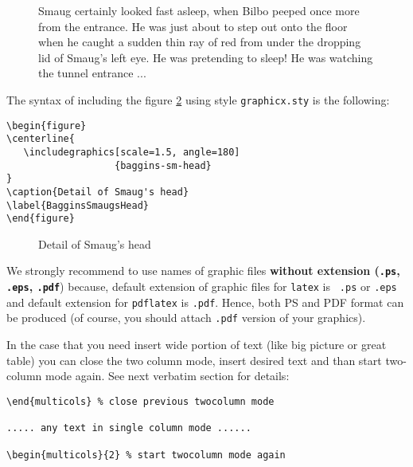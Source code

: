 \begin{multicols}{2}
\begin{figure}
\caption{\label{BagginsSmaug}Smaug certainly looked fast asleep, when Bilbo peeped once more from the
  entrance. He was just about to step out onto the floor when he caught a sudden thin ray
  of red from under the dropping lid of Smaug's left eye. He was pretending to sleep! He
  was watching the tunnel entrance ...}
\end{figure}


The syntax of including the figure \ref{BagginsSmaugsHead} using
style {\tt graphicx.sty} is the following:


\begin{Verbatim}[fontsize=\relsize{-2}]
\begin{figure}
\centerline{
   \includegraphics[scale=1.5, angle=180]
                   {baggins-sm-head}
}
\caption{Detail of Smaug's head}
\label{BagginsSmaugsHead}
\end{figure}
\end{Verbatim}



\begin{figure}
\caption{Detail of Smaug's head}
\label{BagginsSmaugsHead}
\end{figure}



We strongly recommend to use names of graphic files {\bf without extension ({\tt .ps}, {\tt
  .eps}, {\tt .pdf}}) because, default extension of graphic files for {\tt latex} is {\tt
  .ps} or {\tt .eps} and default extension for {\tt pdflatex} is {\tt .pdf}. Hence, both
PS and PDF format can be produced (of course, you should attach {\tt .pdf} version of
your graphics).

\end{multicols}






In the case that you need insert wide portion of text (like big picture or great table) you
can close the two column mode, insert desired text and than start two-column mode again. See
next verbatim section for details:

\begin{Verbatim}[fontsize=\relsize{-2}]
\end{multicols} % close previous twocolumn mode

..... any text in single column mode ......

\begin{multicols}{2} % start twocolumn mode again
\end{Verbatim}

